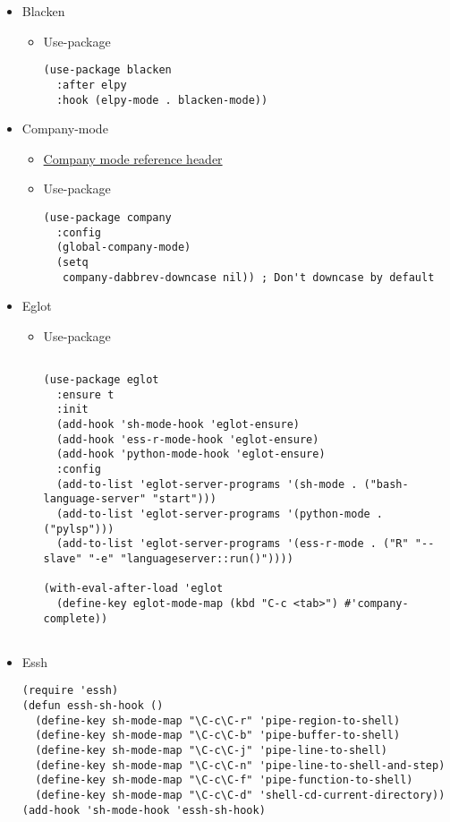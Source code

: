 \documentclass{article}
\begin{document}
\begin{itemize}
\begin{itemize}
\begin{verbatim}
\end{verbatim}
\end{itemize}
\item Blacken
\label{sec:orga0e077e}
\begin{itemize}
\item Use-package
\label{sec:orgfb3ecbc}
\begin{verbatim}
(use-package blacken
  :after elpy
  :hook (elpy-mode . blacken-mode))
\end{verbatim}
\end{itemize}

\item Company-mode
\label{sec:org01f039f}
\begin{itemize}
\item \href{basecamp.org}{Company mode reference header}
\label{sec:org5c8cfb6}
\item Use-package
\label{sec:org7e4e1a6}
\begin{verbatim}
(use-package company
  :config
  (global-company-mode)
  (setq
   company-dabbrev-downcase nil)) ; Don't downcase by default

\end{verbatim}
\end{itemize}
\item Eglot
\label{sec:org56a08f0}
\begin{itemize}
\item Use-package
\label{sec:org2559658}
\begin{verbatim}

(use-package eglot
  :ensure t
  :init
  (add-hook 'sh-mode-hook 'eglot-ensure)
  (add-hook 'ess-r-mode-hook 'eglot-ensure)
  (add-hook 'python-mode-hook 'eglot-ensure)
  :config
  (add-to-list 'eglot-server-programs '(sh-mode . ("bash-language-server" "start")))
  (add-to-list 'eglot-server-programs '(python-mode . ("pylsp")))
  (add-to-list 'eglot-server-programs '(ess-r-mode . ("R" "--slave" "-e" "languageserver::run()"))))

(with-eval-after-load 'eglot
  (define-key eglot-mode-map (kbd "C-c <tab>") #'company-complete))


\end{verbatim}
\end{itemize}

\item Essh
\label{sec:orgc0a9143}
\begin{verbatim}
(require 'essh)
(defun essh-sh-hook ()
  (define-key sh-mode-map "\C-c\C-r" 'pipe-region-to-shell)
  (define-key sh-mode-map "\C-c\C-b" 'pipe-buffer-to-shell)
  (define-key sh-mode-map "\C-c\C-j" 'pipe-line-to-shell)
  (define-key sh-mode-map "\C-c\C-n" 'pipe-line-to-shell-and-step)
  (define-key sh-mode-map "\C-c\C-f" 'pipe-function-to-shell)
  (define-key sh-mode-map "\C-c\C-d" 'shell-cd-current-directory))
(add-hook 'sh-mode-hook 'essh-sh-hook)


\end{verbatim}
\end{itemize}
\end{document}
